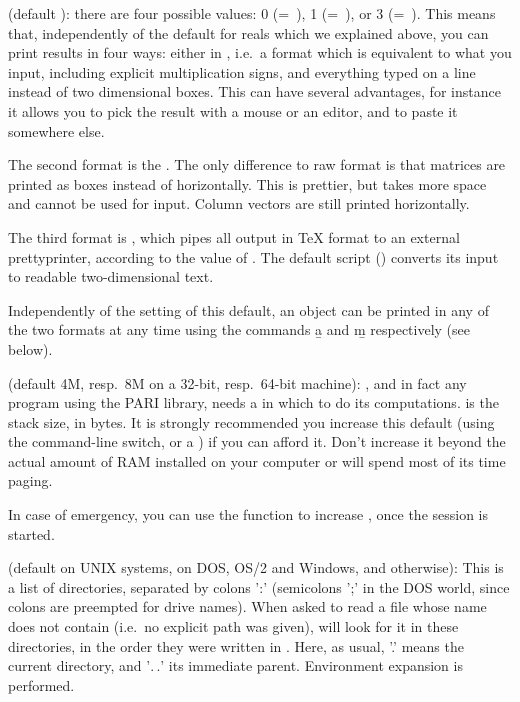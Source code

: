  (default ): there are four possible values: 0
(=~), 1 (=~), or 3
(=~). This
means that, independently of the default  for reals which we
explained above, you can print results in four ways: either in , i.e.~a format which is equivalent to what you input, including
explicit multiplication signs, and everything typed on a line instead of
two dimensional boxes. This can have several advantages, for instance it
allows you to pick the result with a mouse or an editor, and to paste it
somewhere else.\label{se:output}

The second format is the . The only difference to
raw format is that matrices are printed as boxes instead of horizontally.
This is prettier, but takes more space and cannot be used for input. Column
vectors are still printed horizontally.

The third format is , which pipes
all  output in TeX format to an external prettyprinter, according to the
value of . The default script () converts
its input to readable two-dimensional text.

Independently of the setting of this default, an object can be printed
in any of the two formats at any time using the commands \b{a} and \b{m}
respectively (see below).

\label{se:parisize} (default 4M, resp.~8M on a 32-bit,
resp.~64-bit machine): , and in fact any program using the PARI
library, needs a  in which to do its computations. 
is the stack size, in bytes. It is strongly recommended you increase this
default (using the  command-line switch, or a ) if you can
afford it. Don't increase it beyond the actual amount of RAM installed on
your computer or  will spend most of its time paging.

In case of emergency, you can use the  function to
increase , once the session is started.

 (default  on UNIX systems,
 on DOS, OS/2 and Windows, and  otherwise):
This is a list of directories, separated by colons ':' (semicolons ';' in the
DOS world, since colons are preempted for drive names). When asked to read a
file whose name does not contain \kbd{/} (i.e.~no explicit path was given),
 will look for it in these directories, in the order they were written in
. Here, as usual, '.' means the current directory, and '$.\,.$' its
immediate parent. Environment expansion is performed.

